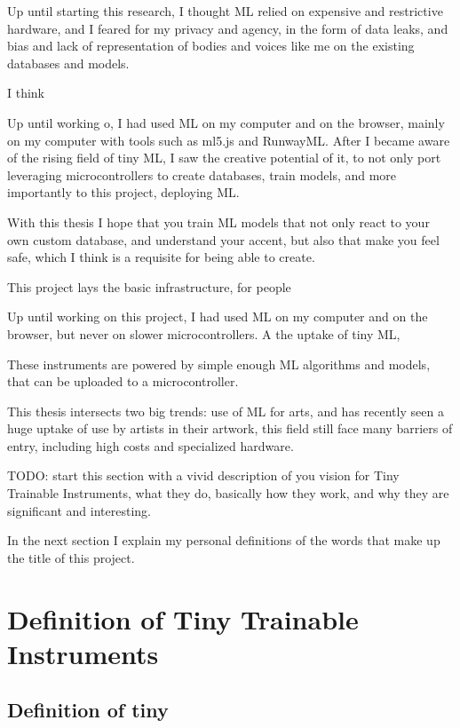 Up until starting this research, I thought \acrshort{ML} relied on expensive and restrictive hardware, and I feared for my privacy and agency, in the form of data leaks, and bias and lack of representation of bodies and voices like me on the existing databases and models.

I think 

Up until working o, I had used \acrshort{ML} on my computer and on the browser, mainly on my computer with tools such as ml5.js and RunwayML. After I became aware of the rising field of tiny \acrshort{ML}, I saw the creative potential of it, to not only port 
leveraging microcontrollers to create databases, train models, and more importantly to this project, deploying \acrshort{ML}.


With this thesis I hope that you train \acrshort{ML} models that not only react to your own custom database, and understand your accent, but also that make you feel safe, which I think is a requisite for being able to create.

This project lays the basic infrastructure, for people 

Up until working on this project, I had used \acrshort{ML} on my computer and on the browser, but never on slower microcontrollers. A the uptake of tiny \acrshort{ML}, 

These instruments are powered by simple enough \acrshort{ML} algorithms and models, that can be uploaded to a microcontroller.

This thesis intersects two big trends: use of \acrshort{ML} for arts, and  has recently seen a huge uptake of use by artists in their artwork, this field still face many barriers of entry, including high costs and specialized hardware.

TODO: start this section with a vivid description of you vision for Tiny Trainable Instruments, what they do, basically how they work, and why they are significant and interesting. 

In the next section I explain my personal definitions of the words that make up the title of this project.

\section{Definition of Tiny Trainable Instruments}

\subsection{Definition of tiny}


